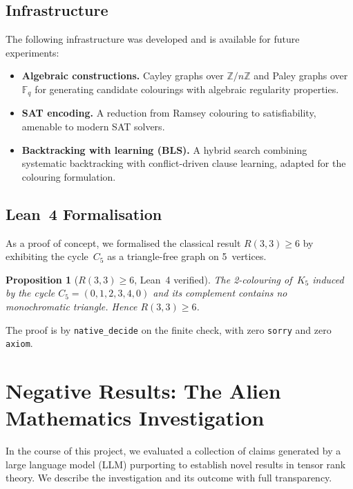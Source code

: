 \documentclass[11pt,a4paper]{article}
\newtheorem{proposition}[theorem]{Proposition}
\begin{document}
\subsection{Infrastructure}

The following infrastructure was developed and is available for future
experiments:
\begin{itemize}
  \item \textbf{Algebraic constructions.} Cayley graphs over
    $\mathbb{Z}/n\mathbb{Z}$ and Paley graphs over~$\mathbb{F}_q$ for
    generating candidate colourings with algebraic regularity properties.
  \item \textbf{SAT encoding.} A reduction from Ramsey colouring to
    satisfiability, amenable to modern SAT solvers.
  \item \textbf{Backtracking with learning (BLS).} A hybrid search combining
    systematic backtracking with conflict-driven clause learning, adapted
    for the colouring formulation.
\end{itemize}

\subsection{Lean~4 Formalisation}

As a proof of concept, we formalised the classical result $R(3,3) \geq 6$
by exhibiting the cycle~$C_5$ as a triangle-free graph on 5~vertices.

\begin{proposition}[$R(3,3) \geq 6$, Lean~4 verified]\label{prop:ramsey33}
The 2-colouring of~$K_5$ induced by the cycle $C_5 = (0,1,2,3,4,0)$ and
its complement contains no monochromatic triangle. Hence $R(3,3) \geq 6$.
\end{proposition}

\noindent The proof is by \texttt{native\_decide} on the finite check, with
zero \texttt{sorry} and zero \texttt{axiom}.

\section{Negative Results: The Alien Mathematics Investigation}
\label{sec:negative}

In the course of this project, we evaluated a collection of claims generated
by a large language model (LLM) purporting to establish novel results in
tensor rank theory. We describe the investigation and its outcome with full
transparency.
\end{document}
